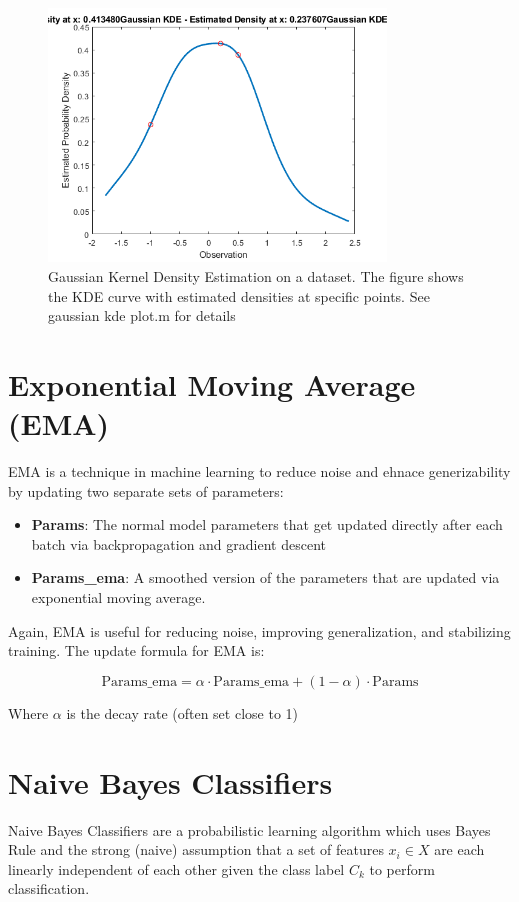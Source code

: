 \documentclass[12pt]{article}
\begin{document}
\begin{figure}[H]
    \centering
    \includegraphics[width=0.8\textwidth]{./gaussian_kde.png} %
    \caption{Gaussian Kernel Density Estimation on a dataset. The figure shows the KDE curve with estimated densities at specific points. See gaussian kde plot.m for details}
    \label{fig:gaussian_kde}
\end{figure}
\section{Exponential Moving Average (EMA)} 
EMA is a technique in machine learning to reduce noise and ehnace generizability by updating two separate sets of parameters:
\begin{itemize}
\item \textbf{Params}: The normal model parameters that get updated directly after each batch via backpropagation and gradient descent
\item \textbf{Params\_ema}: A smoothed version of the parameters that are updated via exponential moving average. 
\end{itemize}
Again, EMA is useful for reducing noise, improving generalization, and stabilizing training. The update formula for EMA is:

\[\text{Params\_ema} = \alpha \cdot \text{Params\_ema} + (1 - \alpha) \cdot \text{Params}\]

Where \(\alpha\) is the decay rate (often set close to 1)

\section{Naive Bayes Classifiers}
Naive Bayes Classifiers are a probabilistic learning algorithm which uses Bayes Rule and the strong (naive) assumption that a set of features \(x_i \in X\) are each linearly independent of each other given the class label \(C_k\) to perform classification. 
\end{document}
